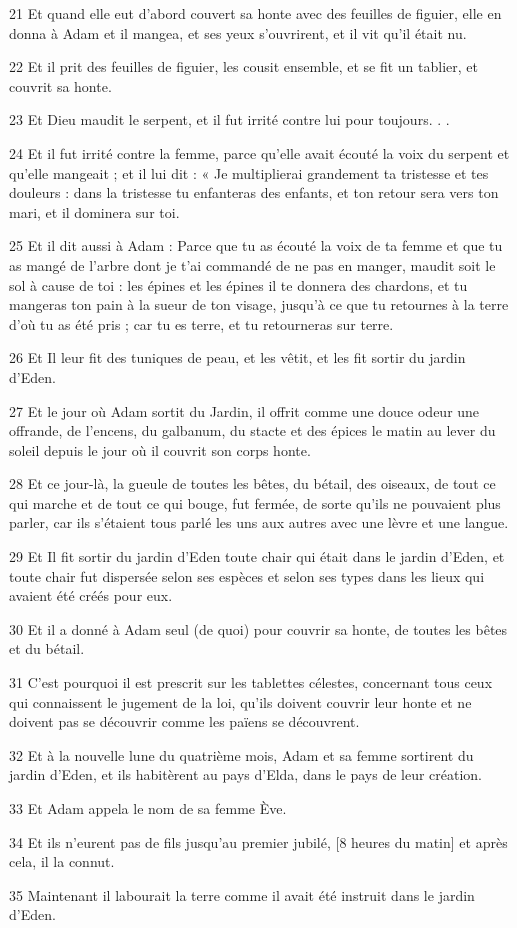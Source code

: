 \par 21 Et quand elle eut d'abord couvert sa honte avec des feuilles de figuier, elle en donna à Adam et il mangea, et ses yeux s'ouvrirent, et il vit qu'il était nu.
\par 22 Et il prit des feuilles de figuier, les cousit ensemble, et se fit un tablier, et couvrit sa honte.
\par 23 Et Dieu maudit le serpent, et il fut irrité contre lui pour toujours. . .
\par 24 Et il fut irrité contre la femme, parce qu'elle avait écouté la voix du serpent et qu'elle mangeait ; et il lui dit : « Je multiplierai grandement ta tristesse et tes douleurs : dans la tristesse tu enfanteras des enfants, et ton retour sera vers ton mari, et il dominera sur toi.
\par 25 Et il dit aussi à Adam : Parce que tu as écouté la voix de ta femme et que tu as mangé de l'arbre dont je t'ai commandé de ne pas en manger, maudit soit le sol à cause de toi : les épines et les épines il te donnera des chardons, et tu mangeras ton pain à la sueur de ton visage, jusqu'à ce que tu retournes à la terre d'où tu as été pris ; car tu es terre, et tu retourneras sur terre.
\par 26 Et Il leur fit des tuniques de peau, et les vêtit, et les fit sortir du jardin d'Eden.
\par 27 Et le jour où Adam sortit du Jardin, il offrit comme une douce odeur une offrande, de l'encens, du galbanum, du stacte et des épices le matin au lever du soleil depuis le jour où il couvrit son corps honte.
\par 28 Et ce jour-là, la gueule de toutes les bêtes, du bétail, des oiseaux, de tout ce qui marche et de tout ce qui bouge, fut fermée, de sorte qu'ils ne pouvaient plus parler, car ils s'étaient tous parlé les uns aux autres avec une lèvre et une langue.
\par 29 Et Il fit sortir du jardin d'Eden toute chair qui était dans le jardin d'Eden, et toute chair fut dispersée selon ses espèces et selon ses types dans les lieux qui avaient été créés pour eux.
\par 30 Et il a donné à Adam seul (de quoi) pour couvrir sa honte, de toutes les bêtes et du bétail.
\par 31 C'est pourquoi il est prescrit sur les tablettes célestes, concernant tous ceux qui connaissent le jugement de la loi, qu'ils doivent couvrir leur honte et ne doivent pas se découvrir comme les païens se découvrent.
\par 32 Et à la nouvelle lune du quatrième mois, Adam et sa femme sortirent du jardin d'Eden, et ils habitèrent au pays d'Elda, dans le pays de leur création.
\par 33 Et Adam appela le nom de sa femme Ève.
\par 34 Et ils n'eurent pas de fils jusqu'au premier jubilé, [8 heures du matin] et après cela, il la connut.
\par 35 Maintenant il labourait la terre comme il avait été instruit dans le jardin d'Eden.

